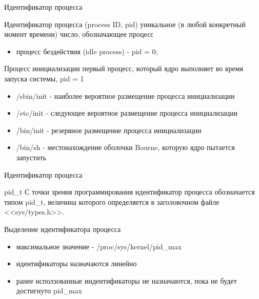 \documentclass[xcolor=table]{beamer}
\begin{document}
\begin{frame}{Идентификатор процесса}
	\begin{block}{Идентификатор процесса (process ID, pid)}
		уникальное (в любой конкретный момент времени) число, обозначающее процесс
	\end{block}
	\begin{itemize}
		\item процесс бездействия (idle process) - pid = 0;
	\end{itemize}
	\begin{block}{Процесс инициализации}
		первый процесс, который ядро выполняет во время запуска системы, pid = 1
	\end{block}
	\begin{itemize}
		\item /sbin/init - наиболее вероятное размещение процесса инициализации 
		\item /etc/init - следующее вероятное размещение процесса инициализации
		\item /bin/init - резервное размещение процесса инициализации
		\item /bin/sh - местонахождение оболочки Bourne, которую ядро пытается запустить
	\end{itemize}
\end{frame}

\begin{frame}{Идентификатор процесса}
	\begin{block}{pid\_t}
		С точки зрения программирования идентификатор процесса обозначается типом pid\_t, величина которого определяется в заголовочном файле <<sys/types.h>>. 
	\end{block}
	Выделение идентификатора процесса
	\begin{itemize}
		\item максимальное значение - /proc/sys/kernel/pid\_max
		\item идентификаторы назначаются линейно
		\item ранее исползованные индентификаторы не назначаются, пока не будет достигнуто pid\_max 
	\end{itemize}
\end{frame}
\end{document}

